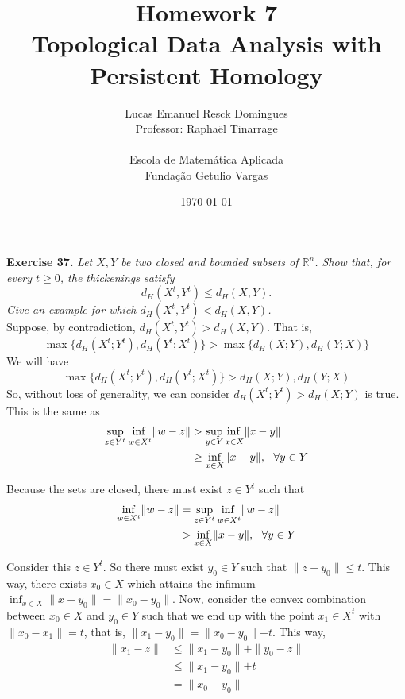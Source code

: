 \documentclass{article}
\title{Homework 7\\
    \large{Topological Data Analysis with Persistent Homology}}
\author{Lucas Emanuel Resck Domingues\\    
    Professor: Raphaël Tinarrage\\\\
    {Escola de Matemática Aplicada}\\
    {Fundação Getulio Vargas}}
\date{\today}
\begin{document}
    \maketitle

    \noindent \textbf{Exercise 37.} \textit{Let $X, Y$ be two closed and bounded subsets of $\mathbb{R}^n$.
    Show that, for every $t \ge 0$, the thickenings satisfy
    \[d_H(X^t, Y^t) \le d_H(X, Y).\]
    Give an example for which $d_H(X^t, Y^t) < d_H(X, Y)$.} \\

    Suppose, by contradiction, $d_H(X^t, Y^t) > d_H(X, Y)$.
    That is, \[\max\{d_H(X^t; Y^t), d_H(Y^t; X^t)\} > \max\{d_H(X; Y), d_H(Y; X)\}\]
    We will have \[\max\{d_H(X^t; Y^t), d_H(Y^t; X^t)\} > d_H(X; Y), d_H(Y; X)\]
    So, without loss of generality, we can consider $d_H(X^t; Y^t) > d_H(X; Y)$ is true.
    This is the same as
    \begin{align*}
        \adjustlimits\sup_{z \in Y^t} \inf_{w \in X^t} \lVert w - z \lVert &> \adjustlimits \sup_{y \in Y} \inf_{x \in X} \lVert x - y \lVert \\
        &\ge \inf_{x \in X} \lVert x - y \lVert, \ \ \forall y \in Y
    \end{align*}

    Because the sets are closed, there must exist $z \in Y^t$ such that 
    \begin{align*}
        \inf_{w \in X^t} \lVert w - z \lVert &= \adjustlimits\sup_{z \in Y^t} \inf_{w \in X^t} \lVert w - z \lVert \\
        &> \inf_{x \in X} \lVert x - y \lVert, \ \ \forall y \in Y
    \end{align*}

    Consider this $z \in Y^t$.
    So there must exist $y_0 \in Y$ such that $\lVert z - y_0 \lVert \le t$.
    This way, there exists $x_0 \in X$ which attains the infimum $\inf_{x \in X} \lVert x - y_0 \lVert = \lVert x_0 - y_0 \lVert$.
    Now, consider the convex combination between $x_0 \in X$ and $y_0 \in Y$ such that we end up with the point $x_1 \in X^t$ with $\lVert x_0 - x_1 \lVert = t$, that is, $\lVert x_1 - y_0 \lVert = \lVert x_0 - y_0 \lVert - t$.
    This way,
    \begin{align*}
        \lVert x_1 - z \lVert &\le \lVert x_1 - y_0 \lVert + \lVert y_0 - z \lVert \\
        &\le \lVert x_1 - y_0 \lVert + t \\
        &= \lVert x_0 - y_0 \lVert
    \end{align*}
\end{document}

